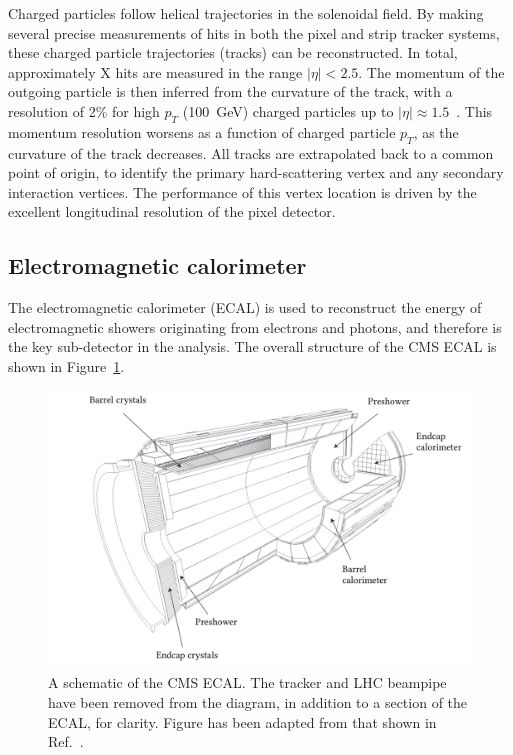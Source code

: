 Charged particles follow helical trajectories in the solenoidal field. By making several precise measurements of hits in both the pixel and strip tracker systems, these charged particle trajectories (tracks) can be reconstructed. In total, approximately X hits are measured in the range $|\eta|<2.5$. The momentum of the outgoing particle is then inferred from the curvature of the track, with a resolution of 2\% for high $p_T$ (100~GeV) charged particles up to $|\eta|\approx1.5$~\cite{}. This momentum resolution worsens as a function of charged particle $p_T$, as the curvature of the track decreases. All tracks are extrapolated back to a common point of origin, to identify the primary hard-scattering vertex and any secondary interaction vertices. The performance of this vertex location is driven by the excellent longitudinal resolution of the pixel detector.

\subsection{Electromagnetic calorimeter}\label{sec:cms_ecal}
The electromagnetic calorimeter (ECAL) is used to reconstruct the energy of electromagnetic showers originating from electrons and photons, and therefore is the key sub-detector in the \Hgg analysis. The overall structure of the CMS ECAL is shown in Figure~\ref{fig:cms_ecal}. 

\begin{figure}[htb!]
  \centering
  \includegraphics[width=1\textwidth]{Figures/cms/ecal.pdf}
  \caption[The CMS electromagnetic calorimeter]
  {
    A schematic of the CMS ECAL. The tracker and LHC beampipe have been removed from the diagram, in addition to a section of the ECAL, for clarity. Figure has been adapted from that shown in Ref.~\cite{}.
  }
  \label{fig:cms_ecal}
\end{figure}


